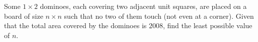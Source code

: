Some $1\times 2$ dominoes, each covering two adjacent unit squares, are placed on a board of size $n\times n$ such that no two of them touch (not even at a corner). Given that the total area covered by the dominoes is $2008$,  find the least possible value of $n$.